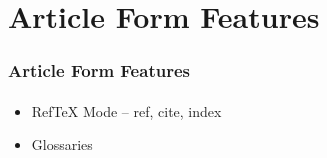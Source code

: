 \begin{comment}
*  [[elisp:(org-cycle)][| ]] [[elisp:(org-show-subtree)][|=]] [[elisp:(show-children 10)][|V]] [[elisp:(bx:orgm:indirectBufOther)][|>]] [[elisp:(bx:orgm:indirectBufMain)][|I]] [[elisp:(blee:ppmm:org-mode-toggle)][|N]] [[elisp:(org-top-overview)][|O]] [[elisp:(progn (org-shifttab) (org-content))][|C]] [[elisp:(delete-other-windows)][|1]]  /Section/   Article Form Features ::  [[elisp:(org-cycle)][| ]]
\end{comment}

\section{Article Form Features}

\begin{comment}
*****  [[elisp:(org-cycle)][| ]]  [[elisp:(blee:ppmm:org-mode-toggle)][Nat]] [[elisp:(beginning-of-buffer)][Top]] [[elisp:(delete-other-windows)][(1)]] || /Frame/ *Label=ArticleFormFeatures*  Article Form Features ::  [[elisp:(org-cycle)][| ]]
\end{comment}

\begin{frame}[fragile,label=ArticleFormFeatures]
    \frametitle{Article Form Features}
    \framesubtitle{}

    \begin{itemize}
    \item RefTeX Mode -- ref, cite, index
    \item Glossaries
    \end{itemize}

\end{frame}


\begin{comment}
**  [[elisp:(org-cycle)][| ]] [[elisp:(org-show-subtree)][|=]] [[elisp:(show-children 10)][|V]] [[elisp:(bx:orgm:indirectBufOther)][|>]] [[elisp:(bx:orgm:indirectBufMain)][|I]] [[elisp:(blee:ppmm:org-mode-toggle)][|N]] [[elisp:(org-top-overview)][|O]] [[elisp:(progn (org-shifttab) (org-content))][|C]] [[elisp:(delete-other-windows)][|1]]  /Subsection/   RefTeX Mode -- ref, cite, index ::  [[elisp:(org-cycle)][| ]]
\end{comment}

